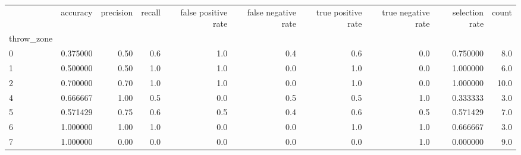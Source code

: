\begin{tabular}{lrrrrrrrrr}
\toprule
{} &  accuracy &  precision &  recall &  false positive rate &  false negative rate &  true positive rate &  true negative rate &  selection rate &  count \\
throw\_zone &           &            &         &                      &                      &                     &                     &                 &        \\
\midrule
0          &  0.375000 &       0.50 &     0.6 &                  1.0 &                  0.4 &                 0.6 &                 0.0 &        0.750000 &    8.0 \\
1          &  0.500000 &       0.50 &     1.0 &                  1.0 &                  0.0 &                 1.0 &                 0.0 &        1.000000 &    6.0 \\
2          &  0.700000 &       0.70 &     1.0 &                  1.0 &                  0.0 &                 1.0 &                 0.0 &        1.000000 &   10.0 \\
4          &  0.666667 &       1.00 &     0.5 &                  0.0 &                  0.5 &                 0.5 &                 1.0 &        0.333333 &    3.0 \\
5          &  0.571429 &       0.75 &     0.6 &                  0.5 &                  0.4 &                 0.6 &                 0.5 &        0.571429 &    7.0 \\
6          &  1.000000 &       1.00 &     1.0 &                  0.0 &                  0.0 &                 1.0 &                 1.0 &        0.666667 &    3.0 \\
7          &  1.000000 &       0.00 &     0.0 &                  0.0 &                  0.0 &                 0.0 &                 1.0 &        0.000000 &    9.0 \\
\bottomrule
\end{tabular}
